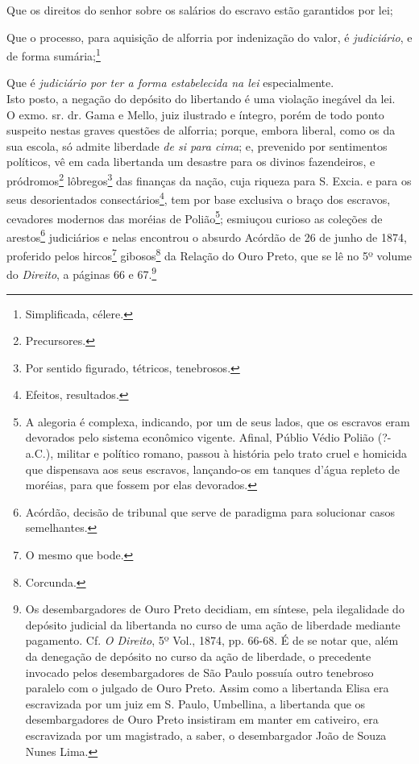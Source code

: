 Que os direitos do senhor sobre os salários do escravo estão garantidos
por lei;

Que o processo, para aquisição de alforria por indenização do valor, é
\emph{judiciário}, e de forma sumária;\footnote{Simplificada, célere.}

Que é \emph{judiciário por ter a forma estabelecida na lei}
especialmente.\\
Isto posto, a negação do depósito do libertando é uma violação inegável
da lei.\\
O exmo. sr. dr. Gama e Mello, juiz ilustrado e íntegro, porém de todo
ponto suspeito nestas graves questões de alforria; porque, embora
liberal, como os da sua escola, só admite liberdade \emph{de si para
cima}; e, prevenido por sentimentos políticos, vê em cada libertanda um
desastre para os divinos fazendeiros, e pródromos\footnote{
  Precursores.} lôbregos\footnote{Por sentido figurado, tétricos,
  tenebrosos.} das finanças da nação, cuja riqueza para S. Excia. e para
os seus desorientados consectários\footnote{Efeitos, resultados.}, tem
por base exclusiva o braço dos escravos, cevadores modernos das moréias
de Polião\footnote{A alegoria é complexa, indicando, por um de seus
  lados, que os escravos eram devorados pelo sistema econômico vigente.
  Afinal, Públio Védio Polião (?- a.C.), militar e político romano,
  passou à história pelo trato cruel e homicida que dispensava aos seus
  escravos, lançando-os em tanques d'água repleto de moréias, para que
  fossem por elas devorados.}; esmiuçou curioso as coleções de
arestos\footnote{Acórdão, decisão de tribunal que serve de paradigma
  para solucionar casos semelhantes.} judiciários e nelas encontrou o
absurdo Acórdão de 26 de junho de 1874, proferido pelos hircos\footnote{
  O mesmo que bode.} gibosos\footnote{Corcunda.} da Relação do Ouro
Preto, que se lê no 5º volume do \emph{Direito}, a páginas 66 e
67.\footnote{Os desembargadores de Ouro Preto decidiam, em síntese,
  pela ilegalidade do depósito judicial da libertanda no curso de uma
  ação de liberdade mediante pagamento. Cf. \emph{O Direito}, 5º Vol.,
  1874, pp. 66-68. É de se notar que, além da denegação de depósito no
  curso da ação de liberdade, o precedente invocado pelos
  desembargadores de São Paulo possuía outro tenebroso paralelo com o
  julgado de Ouro Preto. Assim como a libertanda Elisa era escravizada
  por um juiz em S. Paulo, Umbellina, a libertanda que os
  desembargadores de Ouro Preto insistiram em manter em cativeiro, era
  escravizada por um magistrado, a saber, o desembargador João de Souza
  Nunes Lima.}

